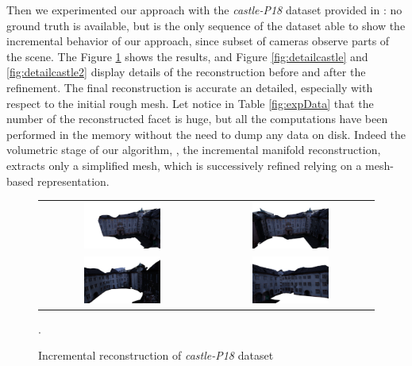 Then we experimented our approach with the \emph{castle-P18} dataset provided in \cite{strecha2008}: no ground truth is available, but is the only sequence of the dataset able to show the incremental behavior of our approach, since subset of cameras observe parts of the scene. 
The Figure \ref{fig:castle} shows the results, and Figure \ref{fig:detailcastle} and \ref{fig:detailcastle2} display details of the reconstruction before and after the refinement. The final reconstruction is accurate  an detailed, especially with respect to the initial rough mesh.
Let notice in Table \ref{fig:expData} that the number of the reconstructed facet is huge, but all the computations have been performed in the memory without the need to dump any data on disk. Indeed the volumetric stage of our algorithm, \ie, the incremental manifold reconstruction, extracts only a  simplified mesh, which is successively refined relying on a mesh-based representation.



\begin{figure}[t]
\centering
\setlength{\tabcolsep}{1px}
\begin{tabular}{cc}
\includegraphics[width=0.48\textwidth]{./img/ch-incr-dens/castle01}&
\includegraphics[width=0.48\textwidth]{./img/ch-incr-dens/castle02}\\
\includegraphics[width=0.48\textwidth]{./img/ch-incr-dens/castle03}&
\includegraphics[width=0.48\textwidth]{./img/ch-incr-dens/castle04}
\end{tabular}
\caption{Incremental reconstruction of \emph{castle-P18} dataset}.
\label{fig:castle}
\end{figure}

